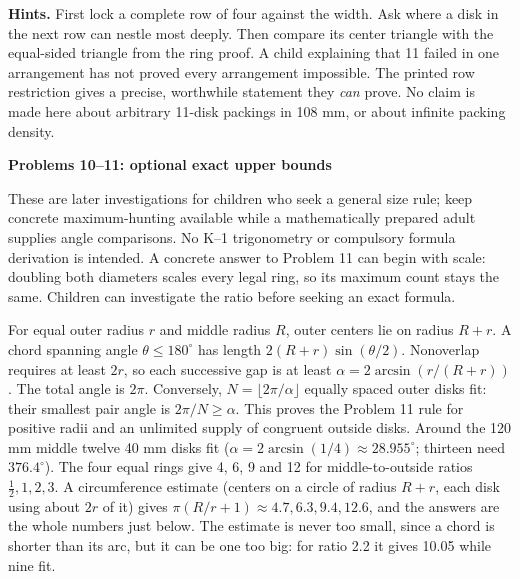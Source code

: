\documentclass[11pt]{article}
\newcommand{\heading}[1]{\par\textbf{#1}\par}
\begin{document}
\begin{center}\end{center}
\textbf{Hints.} First lock a complete row of four against the width. Ask where a disk in the next row can nestle most deeply. Then compare its center triangle with the equal-sided triangle from the ring proof. A child explaining that 11 failed in one arrangement has not proved every arrangement impossible. The printed row restriction gives a precise, worthwhile statement they \emph{can} prove. No claim is made here about arbitrary 11-disk packings in 108 mm, or about infinite packing density.
\newpage
\heading{Problems 10--11: optional exact upper bounds}
These are later investigations for children who seek a general size rule; keep concrete maximum-hunting available while a mathematically prepared adult supplies angle comparisons. No K--1 trigonometry or compulsory formula derivation is intended. A concrete answer to Problem 11 can begin with scale: doubling both diameters scales every legal ring, so its maximum count stays the same. Children can investigate the ratio before seeking an exact formula.

For equal outer radius $r$ and middle radius $R$, outer centers lie on radius $R+r$. A chord spanning angle $\theta\le 180^\circ$ has length $2(R+r)\sin(\theta/2)$. Nonoverlap requires at least $2r$, so each successive gap is at least $\alpha=2\arcsin(r/(R+r))$. The total angle is $2\pi$. Conversely, $N=\lfloor 2\pi/\alpha\rfloor$ equally spaced outer disks fit: their smallest pair angle is $2\pi/N\ge\alpha$. This proves the Problem 11 rule for positive radii and an unlimited supply of congruent outside disks. Around the 120 mm middle twelve 40 mm disks fit ($\alpha=2\arcsin(1/4)\approx 28.955^\circ$; thirteen need $376.4^\circ$). The four equal rings give 4, 6, 9 and 12 for middle-to-outside ratios $\tfrac12,1,2,3$. A circumference estimate (centers on a circle of radius $R+r$, each disk using about $2r$ of it) gives $\pi(R/r+1)\approx 4.7, 6.3, 9.4, 12.6$, and the answers are the whole numbers just below. The estimate is never too small, since a chord is shorter than its arc, but it can be one too big: for ratio 2.2 it gives 10.05 while nine fit.
\end{document}
